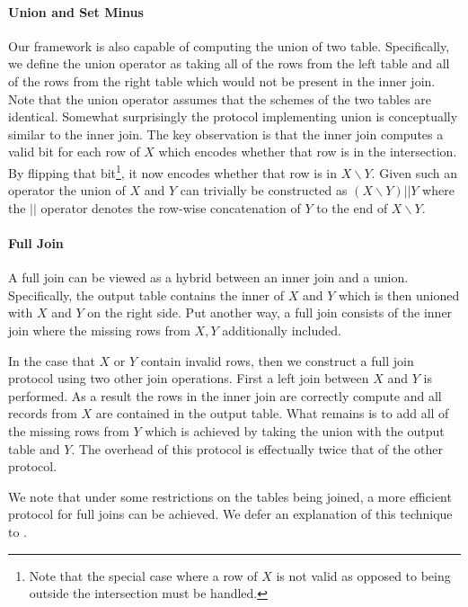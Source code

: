 \paragraph{Union and Set Minus}

Our framework is also capable of computing the union of two table. Specifically, we define the union operator as taking all of the rows from the left table and all of the rows from the right table which would not be present in the inner join. Note that the union operator assumes that the schemes of the two tables are identical. Somewhat surprisingly the protocol implementing union is conceptually similar to the inner join. The key observation is that the inner join computes a valid bit for each row of $X$ which encodes whether that row is in the intersection. By flipping that bit\footnote{Note that the special case where a row of $X$ is not valid as opposed to being outside the intersection must be handled.}, it now encodes whether that row is in $X\backslash Y$. Given such an operator the union of $X$ and $Y$ can trivially be constructed as $(X\backslash Y) || Y$ where the $||$ operator denotes the row-wise concatenation of $Y$ to the end of $X\backslash Y$.


\paragraph{Full Join}

A full join can be viewed as a hybrid between an inner join and a union. Specifically, the output table contains the inner of $X$ and $Y$ which is then unioned with $X$ and $Y$ on the right side. Put another way, a full join consists of the inner join where the missing rows from $X,Y$ additionally included. 

In the case that $X$ or $Y$ contain invalid rows, then we construct a full join protocol using two other join operations. First a left join between $X$ and $Y$ is performed. As a result the rows in the inner join are correctly compute and all records from $X$ are contained in the output table. What remains is to add all of the missing rows from $Y$ which is achieved by taking the union with the output table and $Y$. The overhead of this protocol is effectually twice that of the other protocol.

We note that under some restrictions on the tables being joined, a more efficient protocol for full joins can be achieved. We defer an explanation of this technique to .

